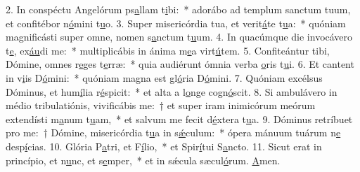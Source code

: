 2. In conspéctu Angelórum ps\uline{a}llam t\uline{i}bi:~* adorábo ad templum sanctum tuum, et confitébor n\uline{ó}mini t\uline{u}o.
3. Super misericórdia tua, et verit\uline{á}te t\uline{u}a:~* quóniam magnificásti super omne, nomen s\uline{a}nctum t\uline{u}um.
4. In quacúmque die invocávero t\uline{e}, ex\uline{áu}di me:~* multiplicábis in ánima m\uline{e}a virt\uline{ú}tem.
5. Confiteántur tibi, Dómine, omnes r\uline{e}ges t\uline{e}rræ:~* quia audiérunt ómnia verba \uline{o}ris t\uline{u}i.
6. Et cantent in v\uline{i}is D\uline{ó}mini:~* quóniam magna est gl\uline{ó}ria D\uline{ó}mini.
7. Quóniam excélsus Dóminus, et hum\uline{í}lia r\uline{é}spicit:~* et alta a l\uline{o}nge cogn\uline{ó}scit.
8. Si ambulávero in médio tribulatiónis, vivificábis me:~† et super iram inimicórum meórum extendísti m\uline{a}num t\uline{u}am,~* et salvum me fecit d\uline{é}xtera t\uline{u}a.
9. Dóminus retríbuet pro me:~† Dómine, misericórdia t\uline{u}a in s\uline{ǽ}culum:~* ópera mánuum tuárum n\uline{e} desp\uline{í}cias.
10. Glória P\uline{a}tri, et F\uline{í}lio,~* et Spir\uline{í}tui S\uline{a}ncto.
11. Sicut erat in princípio, et n\uline{u}nc, et s\uline{e}mper,~* et in sǽcula sæcul\uline{ó}rum. \uline{A}men.

